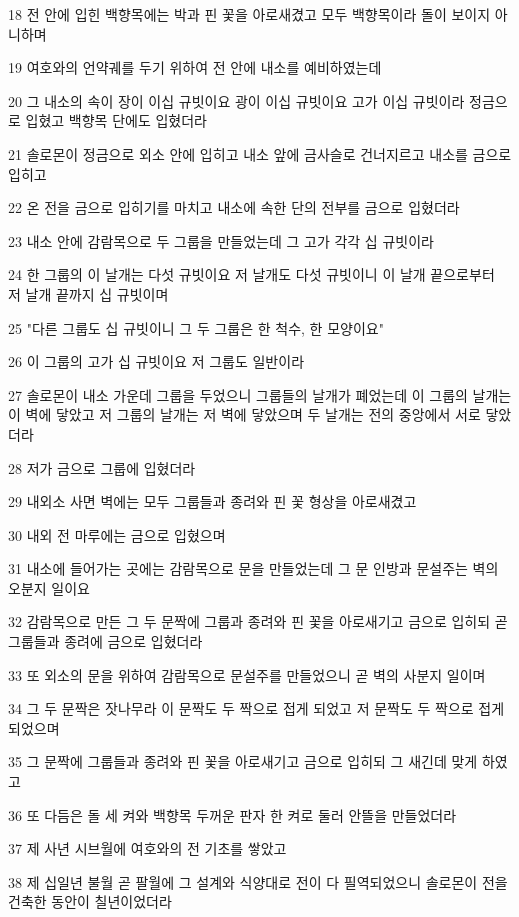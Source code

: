 \par 18 전 안에 입힌 백향목에는 박과 핀 꽃을 아로새겼고 모두 백향목이라 돌이 보이지 아니하며
\par 19 여호와의 언약궤를 두기 위하여 전 안에 내소를 예비하였는데
\par 20 그 내소의 속이 장이 이십 규빗이요 광이 이십 규빗이요 고가 이십 규빗이라 정금으로 입혔고 백향목 단에도 입혔더라
\par 21 솔로몬이 정금으로 외소 안에 입히고 내소 앞에 금사슬로 건너지르고 내소를 금으로 입히고
\par 22 온 전을 금으로 입히기를 마치고 내소에 속한 단의 전부를 금으로 입혔더라
\par 23 내소 안에 감람목으로 두 그룹을 만들었는데 그 고가 각각 십 규빗이라
\par 24 한 그룹의 이 날개는 다섯 규빗이요 저 날개도 다섯 규빗이니 이 날개 끝으로부터 저 날개 끝까지 십 규빗이며
\par 25 "다른 그룹도 십 규빗이니 그 두 그룹은 한 척수, 한 모양이요"
\par 26 이 그룹의 고가 십 규빗이요 저 그룹도 일반이라
\par 27 솔로몬이 내소 가운데 그룹을 두었으니 그룹들의 날개가 폐었는데 이 그룹의 날개는 이 벽에 닿았고 저 그룹의 날개는 저 벽에 닿았으며 두 날개는 전의 중앙에서 서로 닿았더라
\par 28 저가 금으로 그룹에 입혔더라
\par 29 내외소 사면 벽에는 모두 그룹들과 종려와 핀 꽃 형상을 아로새겼고
\par 30 내외 전 마루에는 금으로 입혔으며
\par 31 내소에 들어가는 곳에는 감람목으로 문을 만들었는데 그 문 인방과 문설주는 벽의 오분지 일이요
\par 32 감람목으로 만든 그 두 문짝에 그룹과 종려와 핀 꽃을 아로새기고 금으로 입히되 곧 그룹들과 종려에 금으로 입혔더라
\par 33 또 외소의 문을 위하여 감람목으로 문설주를 만들었으니 곧 벽의 사분지 일이며
\par 34 그 두 문짝은 잣나무라 이 문짝도 두 짝으로 접게 되었고 저 문짝도 두 짝으로 접게 되었으며
\par 35 그 문짝에 그룹들과 종려와 핀 꽃을 아로새기고 금으로 입히되 그 새긴데 맞게 하였고
\par 36 또 다듬은 돌 세 켜와 백향목 두꺼운 판자 한 켜로 둘러 안뜰을 만들었더라
\par 37 제 사년 시브월에 여호와의 전 기초를 쌓았고
\par 38 제 십일년 불월 곧 팔월에 그 설계와 식양대로 전이 다 필역되었으니 솔로몬이 전을 건축한 동안이 칠년이었더라

